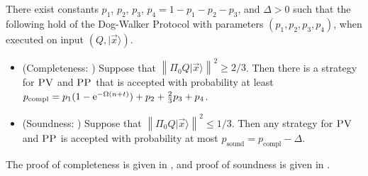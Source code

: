 \documentclass{toc}
\newcommand{\ket}[1]{|#1\rangle}
\DeclareMathOperator{\sound}{sound}
\DeclareMathOperator{\compl}{compl}
\newcommand{\norm}[1]{\left\|#1\right\|}
\newcommand{\pv}{\textsc{PV}}
\newcommand{\pp}{\textsc{PP}}
\begin{document}
\begin{theorem}\label{thm:dog-walker}
There exist constants $p_1$, $p_2$, $p_3$, $p_4=1-p_1-p_2-p_3$, and $\Delta>0$ such that the following hold of the Dog-Walker Protocol with parameters $(p_1,p_2,p_3,p_4)$, when executed on input $(Q,\ket{\vec{x}})$.
\begin{itemize}
\item (Completeness: ) Suppose that $\norm{\Pi_0Q\ket{\vec{x}}}^2\geq 2/3$. Then
  there is a strategy for $\pv$ and $\pp$ that is accepted with probability at
    least $p_{\compl}=p_1(1-\eee^{-\Omega(n+t)})+p_2+\frac{2}{3}p_3 +
    p_4$. 
\item (Soundness: ) Suppose that $\norm{\Pi_0Q\ket{\vec{x}}}^2\leq 1/3$. Then any strategy for $\pv$ and $\pp$ is accepted with probability at most $p_{\sound}=p_{\compl}-\Delta$. 
\end{itemize}
\end{theorem}
\noindent The proof of completeness is given in , and proof of soundness is given in . 
\end{document}
